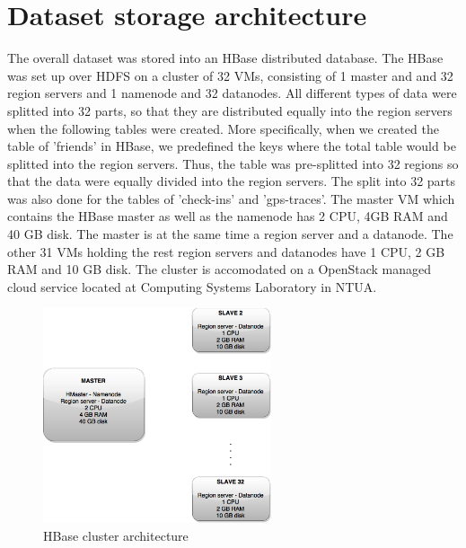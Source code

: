 \section{Dataset storage architecture}

The overall dataset was stored into an HBase distributed database. The HBase was set up over HDFS on a cluster of 32 VMs, consisting of 1 master and and 32 region servers 
and 1 namenode and 32 datanodes. All different types of data were splitted into 32 parts, so that they are distributed equally into the region servers when the 
following tables were created. More specifically, when we created the table of 'friends' in HBase, we predefined the keys where the total table would be splitted 
into the region servers. Thus, the table was pre-splitted into 32 regions so that the data were equally divided into the region servers. The split into 32 parts was 
also done for the tables of 'check-ins' and 'gps-traces'. The master VM which contains the HBase master as well as the namenode has 2 CPU, 4GB RAM and 40 GB disk. 
The master is at the same time a region server and a datanode. The other 31 VMs holding the rest region servers and datanodes have 1 CPU, 2 GB RAM and 10 GB disk. 
The cluster is accomodated on a OpenStack managed cloud service located at Computing Systems Laboratory in NTUA.

\begin{figure}[H]
  \centering
  \includegraphics[width=0.6\textwidth]{figures/hbase_cluster_gray.png}
  \caption{HBase cluster architecture}
\end{figure}

